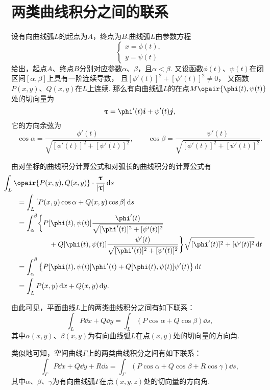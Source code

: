 \section{两类曲线积分之间的联系}
\begingroup
\def\lenTau{\sqrt{[\phi'(t)]^2+[\psi'(t)]^2}}
\def\fTau#1{\frac{#1}{\lenTau}}
\def\funcParam{[\phi(t),\psi(t)]}

设有向曲线弧\(L\)的起点为\(A\)，终点为\(B\).曲线弧\(L\)由参数方程\[
\begin{cases}
x = \phi(t), \\
y = \psi(t)
\end{cases}
\]给出，起点\(A\)、终点\(B\)分别对应参数\(\alpha\)、\(\beta\)，且\(\alpha < \beta\).
又设函数\(\phi(t)\)、\(\psi(t)\)在闭区间\([\alpha,\beta]\)上具有一阶连续导数，
且\([\phi'(t)]^2+[\psi'(t)]^2 \neq 0\)，
又函数\(P(x,y)\)、\(Q(x,y)\)在\(L\)上连续.
那么有向曲线弧\(L\)的在点\(M\opair{\phi(t),\psi(t)}\)处的切向量为\[
\vb{\tau} = \phi'(t) \vb{i} + \psi'(t) \vb{j},
\]它的方向余弦为\[
\cos\alpha=\fTau{\phi'(t)},
\qquad
\cos\beta=\fTau{\psi'(t)}.
\]

由对坐标的曲线积分计算公式和对弧长的曲线积分的计算公式有
\begin{align*}
&\hspace{-20pt}\int_L{\opair{P(x,y),Q(x,y)}\cdot\frac{\vb{\tau}}{\abs{\vb{\tau}}}\dd{s}} \\
&=\int_L{[P(x,y)\cos\alpha+Q(x,y)\cos\beta]\dd{s}} \\
&=\int_{\alpha}^{\beta} \biggl\{ {P\funcParam\fTau{\phi'(t)}} \\
	&\hspace{45pt}+{Q\funcParam\fTau{\psi'(t)}} \biggr\} \lenTau \dd{t} \\
&=\int_{\alpha}^{\beta} \left\{
		P\funcParam\phi'(t) + Q\funcParam\psi'(t)
	\right\} \dd{t} \\
&=\int_L{P(x,y)\dd{x}+Q(x,y)\dd{y}}.
\end{align*}
\endgroup

由此可见，平面曲线\(L\)上的两类曲线积分之间有如下联系：
\begin{equation}\label{equation:线积分与面积分.平面曲线上两类曲线积分之间的联系}
\int_L P\dd{x}+Q\dd{y}
=\int_L{(P\cos\alpha+Q\cos\beta)\dd{s}},
\end{equation}
其中\(\alpha(x,y)\)、\(\beta(x,y)\)为有向曲线弧\(L\)在点\((x,y)\)处的切向量的方向角.

类似地可知，空间曲线\(\Gamma\)上的两类曲线积分之间有如下联系：
\begin{equation}\label{equation:线积分与面积分.空间曲线上两类曲线积分之间的联系}
\int_\Gamma{P\dd{x}+Q\dd{y}+R\dd{z}}
=\int_\Gamma{(P\cos\alpha+Q\cos\beta+R\cos\gamma)\dd{s}},
\end{equation}其中\(\alpha\)、\(\beta\)、\(\gamma\)为有向曲线弧\(\Gamma\)在点\((x,y,z)\)处的切向量的方向角.

